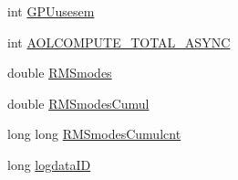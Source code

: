 \begin{DoxyCompactItemize}
int \hyperlink{structAOLOOPCONTROL__CONF_a417dc7e186e8e2d57c23b463aa338833}{G\+P\+Uusesem}
\item 
int \hyperlink{structAOLOOPCONTROL__CONF_a880dc96492d396aa1e13bae23bd6fa85}{A\+O\+L\+C\+O\+M\+P\+U\+T\+E\+\_\+\+T\+O\+T\+A\+L\+\_\+\+A\+S\+Y\+N\+C}
\item 
double \hyperlink{structAOLOOPCONTROL__CONF_ad57090b2c42760337dcf977cd0c18a18}{R\+M\+Smodes}
\item 
double \hyperlink{structAOLOOPCONTROL__CONF_a418390c0a9b27dfb88bf290d420b8466}{R\+M\+Smodes\+Cumul}
\item 
long long \hyperlink{structAOLOOPCONTROL__CONF_aee12f4f173156acefeb6c4705ae6a8b6}{R\+M\+Smodes\+Cumulcnt}
\item 
long \hyperlink{structAOLOOPCONTROL__CONF_a8e7d812fe0913a79bec7c81eb1d0334c}{logdata\+I\+D}
\end{DoxyCompactItemize}


